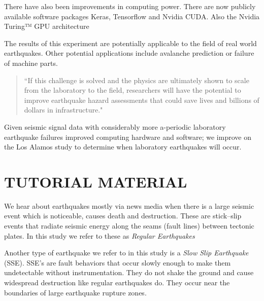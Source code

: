 \documentclass[]{llncs}
\begin{document}
There have also been improvements in computing power. There are now publicly available software packages Keras, Tensorflow and Nvidia CUDA. Also the Nvidia Turing™ GPU architecture \par

The results of this experiment are potentially applicable to the field of real world earthquakes. Other potential applications include avalanche prediction or failure of machine parts.
\begin{quote}
	“If this challenge is solved and the physics are ultimately shown to scale from the laboratory to the field, researchers will have the potential to improve earthquake hazard assessments that could save lives and billions of dollars in infrastructure.\cite{kaggle}"
\end{quote}

Given seismic signal data with considerably more a-periodic laboratory earthquake failures improved computing hardware and software; we improve on the Los Alamos study\cite{Bertrand} to determine when laboratory earthquakes will occur.





\section{TUTORIAL MATERIAL}
We hear about earthquakes mostly via news media when there is a large seismic event which is noticeable, causes death and destruction. These are stick–slip events that radiate seismic energy along the seams (fault lines) between tectonic plates. In this study we refer to these as {\em Regular Earthquakes} \par

Another type of earthquake we refer to in this study is a {\em 
	Slow Slip Earthquake} (SSE). SSE's are fault behaviors that occur slowly enough to make them undetectable without instrumentation. They do not shake the ground and cause widespread destruction like regular earthquakes do. They occur near the boundaries of large earthquake rupture zones\cite{Slip}. \par
\end{document}
